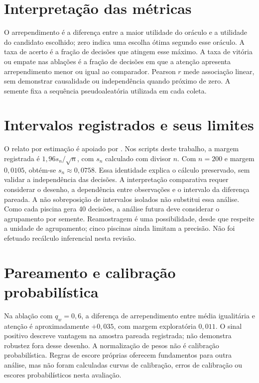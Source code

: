 \section{Interpretação das métricas}
O arrependimento é a diferença entre a maior utilidade do oráculo e a utilidade do candidato escolhido; zero indica uma escolha ótima segundo esse oráculo. A taxa de acerto é a fração de decisões que atingem esse máximo. A taxa de vitória ou empate nas ablações é a fração de decisões em que a atenção apresenta arrependimento menor ou igual ao comparador. Pearson $r$ mede associação linear, sem demonstrar causalidade ou independência quando próximo de zero. A semente fixa a sequência pseudoaleatória utilizada em cada coleta.
\section{Intervalos registrados e seus limites}
O relato por estimação é apoiado por \citet{cumming2014,wasserstein2016}. Nos scripts deste trabalho, a margem registrada é $1{,}96s_n/\sqrt{n}$, com $s_n$ calculado com divisor $n$. Com $n=200$ e margem $0{,}0105$, obtém-se $s_n\approx0{,}0758$. Essa identidade explica o cálculo preservado, sem validar a independência das decisões. A interpretação comparativa requer considerar o desenho, a dependência entre observações e o intervalo da diferença pareada. A não sobreposição de intervalos isolados não substitui essa análise.
Como cada piscina gera 40 decisões, a análise futura deve considerar o agrupamento por semente. Reamostragem \cite{efron1979} é uma possibilidade, desde que respeite a unidade de agrupamento; cinco piscinas ainda limitam a precisão. Não foi efetuado recálculo inferencial nesta revisão.
\section{Pareamento e calibração probabilística}
Na ablação com $q_w=0{,}6$, a diferença de arrependimento entre média igualitária e atenção é aproximadamente $+0{,}035$, com margem exploratória $0{,}011$. O sinal positivo descreve vantagem na amostra pareada registrada; não demonstra robustez fora desse desenho. A normalização de pesos não é calibração probabilística. Regras de escore próprias \cite{gneiting2007} oferecem fundamentos para outra análise, mas não foram calculadas curvas de calibração, erros de calibração ou escores probabilísticos nesta avaliação.
